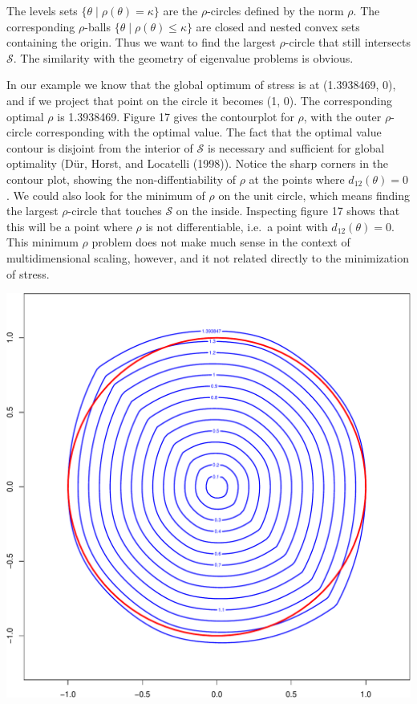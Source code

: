 \documentclass[
  12pt,
]{article}
\begin{document}
The levels sets \(\{\theta\mid\rho(\theta)=\kappa\}\) are the \(\rho\)-circles defined by the norm \(\rho\). The corresponding \(\rho\)-balls \(\{\theta\mid\rho(\theta)\leq\kappa\}\) are closed and nested convex sets containing the origin. Thus we want to find the largest \(\rho\)-circle that
still intersects \(\mathcal{S}\). The similarity with the geometry of eigenvalue problems is obvious.

In our example we know that the global optimum of stress is at (1.3938469, 0), and if we project that point on the circle it becomes (1, 0). The corresponding optimal \(\rho\) is 1.3938469. Figure 17 gives the contourplot for \(\rho\), with the outer \(\rho\)-circle corresponding with the optimal value. The fact that the optimal value contour is disjoint from the interior of \(\mathcal{S}\) is necessary and sufficient for global optimality (Dür, Horst, and Locatelli (1998)). Notice the sharp corners in the contour plot, showing the non-diffentiability of \(\rho\) at the points
where \(d_{12}(\theta)=0\). We could also look for the minimum of \(\rho\) on the unit circle, which means finding the largest \(\rho\)-circle that touches
\(\mathcal{S}\) on the inside. Inspecting figure 17 shows that this will be a point where \(\rho\) is not
differentiable, i.e.~a point with \(d_{12}(\theta)=0\). This minimum \(\rho\) problem does not make much sense in the context of multidimensional scaling,
however, and it not related directly to the minimization of stress.

\begin{center}\includegraphics{twoPoints_files/figure-latex/rho_contour-1} \end{center}
\end{document}
